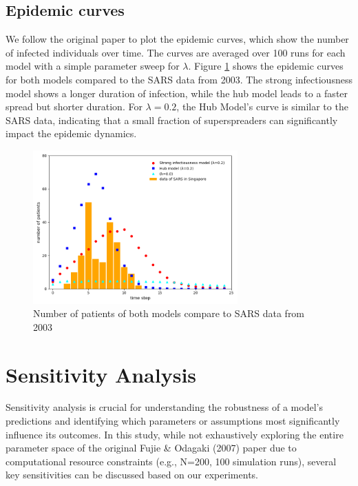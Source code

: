 \documentclass{article}
\begin{document}
\subsection{Epidemic curves}
\label{sec:results_epidemic_curves}
We follow the original paper to plot the epidemic curves, which show the number of infected individuals over time. The curves are averaged over 100 runs for each model with a simple parameter sweep for \(\lambda \). Figure \ref{fig:epidemic_curve} shows the epidemic curves for both models compared to the SARS data from 2003. The strong infectiousness model shows a longer duration of infection, while the hub model leads to a faster spread but shorter duration. For \(\lambda = 0.2\), the Hub Model's curve is similar to the SARS data, indicating that a small fraction of superspreaders can significantly impact the epidemic dynamics.
\begin{figure}[!htbp]
    \centering
        \includegraphics[width=0.7\textwidth]{fig/epidemic_curve.png}
    \caption{Number of patients of both models compare to SARS data from 2003}
    \label{fig:epidemic_curve}
\end{figure}

\section{Sensitivity Analysis}
\label{sec:sensitivity_analysis}

Sensitivity analysis is crucial for understanding the robustness of a model's predictions and identifying which parameters or assumptions most significantly influence its outcomes. In this study, while not exhaustively exploring the entire parameter space of the original Fujie \& Odagaki (2007) paper due to computational resource constraints (e.g., N=200, 100 simulation runs), several key sensitivities can be discussed based on our experiments.
\end{document}
